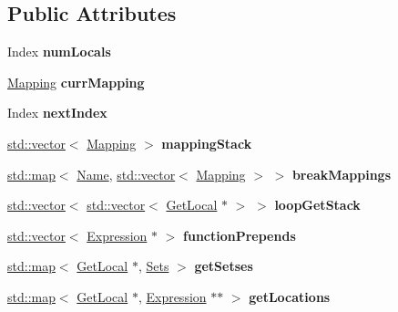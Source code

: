 \subsection*{Public Attributes}
\begin{DoxyCompactItemize}
\item 
\mbox{\label{structwasm_1_1_s_s_aify_aa7a2e783c3a12463a9ae7de803f9b9d3}} 
Index {\bfseries num\+Locals}
\item 
\mbox{\label{structwasm_1_1_s_s_aify_a0069a9b280f31ab8df6bb39e45782e76}} 
\mbox{\hyperlink{classstd_1_1vector}{Mapping}} {\bfseries curr\+Mapping}
\item 
\mbox{\label{structwasm_1_1_s_s_aify_a1c64d132fd5306b0bc610ea0817bdfbd}} 
Index {\bfseries next\+Index}
\item 
\mbox{\label{structwasm_1_1_s_s_aify_a15b945f8b25c19f331d7cdedfa816721}} 
\mbox{\hyperlink{classstd_1_1vector}{std\+::vector}}$<$ \mbox{\hyperlink{classstd_1_1vector}{Mapping}} $>$ {\bfseries mapping\+Stack}
\item 
\mbox{\label{structwasm_1_1_s_s_aify_a461bf1d429340295c22e5775569e0522}} 
\mbox{\hyperlink{classstd_1_1map}{std\+::map}}$<$ \mbox{\hyperlink{structwasm_1_1_name}{Name}}, \mbox{\hyperlink{classstd_1_1vector}{std\+::vector}}$<$ \mbox{\hyperlink{classstd_1_1vector}{Mapping}} $>$ $>$ {\bfseries break\+Mappings}
\item 
\mbox{\label{structwasm_1_1_s_s_aify_af866100bc29a88acd6a872fabdd4d9ba}} 
\mbox{\hyperlink{classstd_1_1vector}{std\+::vector}}$<$ \mbox{\hyperlink{classstd_1_1vector}{std\+::vector}}$<$ \mbox{\hyperlink{classwasm_1_1_get_local}{Get\+Local}} $\ast$ $>$ $>$ {\bfseries loop\+Get\+Stack}
\item 
\mbox{\label{structwasm_1_1_s_s_aify_aca39106decdbeeb8f36cc22819df48d2}} 
\mbox{\hyperlink{classstd_1_1vector}{std\+::vector}}$<$ \mbox{\hyperlink{classwasm_1_1_expression}{Expression}} $\ast$ $>$ {\bfseries function\+Prepends}
\item 
\mbox{\label{structwasm_1_1_s_s_aify_a187f5b1a1f4cf9d2bc16a43c11e3c341}} 
\mbox{\hyperlink{classstd_1_1map}{std\+::map}}$<$ \mbox{\hyperlink{classwasm_1_1_get_local}{Get\+Local}} $\ast$, \mbox{\hyperlink{classstd_1_1set}{Sets}} $>$ {\bfseries get\+Setses}
\item 
\mbox{\label{structwasm_1_1_s_s_aify_a730acdfd5d83c94c4336d4e3a3ef6f3a}} 
\mbox{\hyperlink{classstd_1_1map}{std\+::map}}$<$ \mbox{\hyperlink{classwasm_1_1_get_local}{Get\+Local}} $\ast$, \mbox{\hyperlink{classwasm_1_1_expression}{Expression}} $\ast$$\ast$ $>$ {\bfseries get\+Locations}
\end{DoxyCompactItemize}
